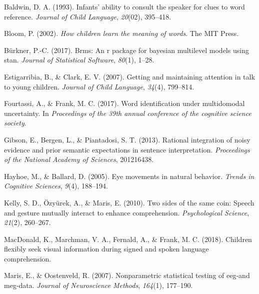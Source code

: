 \documentclass[10pt, letterpaper]{article}
\begin{document}
\setlength{\parindent}{-0.1in} 
\setlength{\leftskip}{0.125in}

\noindent

\hypertarget{refs}{}
\leavevmode\hypertarget{ref-baldwin1993infants}{}%
Baldwin, D. A. (1993). Infants' ability to consult the speaker for clues
to word reference. \emph{Journal of Child Language}, \emph{20}(02),
395--418.

\leavevmode\hypertarget{ref-bloom2002children}{}%
Bloom, P. (2002). \emph{How children learn the meaning of words}. The
MIT Press.

\leavevmode\hypertarget{ref-burkner2017brms}{}%
Bürkner, P.-C. (2017). Brms: An r package for bayesian multilevel models
using stan. \emph{Journal of Statistical Software}, \emph{80}(1), 1--28.

\leavevmode\hypertarget{ref-estigarribia2007getting}{}%
Estigarribia, B., \& Clark, E. V. (2007). Getting and maintaining
attention in talk to young children. \emph{Journal of Child Language},
\emph{34}(4), 799--814.

\leavevmode\hypertarget{ref-fourtassiword2018}{}%
Fourtassi, A., \& Frank, M. C. (2017). Word identification under
multidomodal uncertainty. In \emph{Proceedings of the 39th annual
conference of the cognitive science society}.

\leavevmode\hypertarget{ref-gibson2013rational}{}%
Gibson, E., Bergen, L., \& Piantadosi, S. T. (2013). Rational
integration of noisy evidence and prior semantic expectations in
sentence interpretation. \emph{Proceedings of the National Academy of
Sciences}, 201216438.

\leavevmode\hypertarget{ref-hayhoe2005eye}{}%
Hayhoe, M., \& Ballard, D. (2005). Eye movements in natural behavior.
\emph{Trends in Cognitive Sciences}, \emph{9}(4), 188--194.

\leavevmode\hypertarget{ref-kelly2010two}{}%
Kelly, S. D., Özyürek, A., \& Maris, E. (2010). Two sides of the same
coin: Speech and gesture mutually interact to enhance comprehension.
\emph{Psychological Science}, \emph{21}(2), 260--267.

\leavevmode\hypertarget{ref-macdonald2018children}{}%
MacDonald, K., Marchman, V. A., Fernald, A., \& Frank, M. C. (2018).
Children flexibly seek visual information during signed and spoken
language comprehension.

\leavevmode\hypertarget{ref-maris2007nonparametric}{}%
Maris, E., \& Oostenveld, R. (2007). Nonparametric statistical testing
of eeg-and meg-data. \emph{Journal of Neuroscience Methods},
\emph{164}(1), 177--190.
\end{document}
